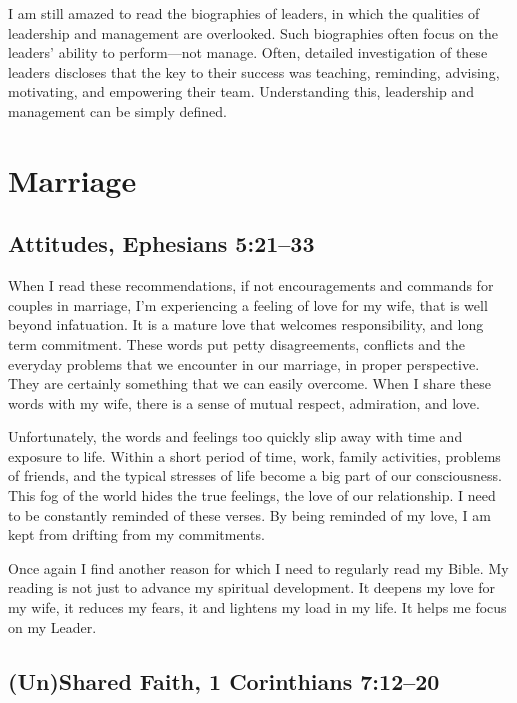 \documentclass[12pt]{memoir}
\begin{document}
I am still amazed to read the biographies of leaders, in which the
qualities of leadership and management are overlooked. Such biographies
often focus on the leaders' ability to perform---not manage. Often,
detailed investigation of these leaders discloses that the key to
their success was teaching, reminding, advising, motivating, and empowering
their team. Understanding this, leadership and management can be simply
defined. 

\section{Marriage}

\subsection[Attitudes]{Attitudes, Ephesians 5:21--33}


When I read these recommendations, if not encouragements and commands for couples in marriage, I'm experiencing a feeling of love for my wife, that is well beyond infatuation. It is a mature love that welcomes
responsibility, and long term commitment. These words put petty disagreements,
conflicts and the everyday problems that we encounter in our marriage,
in proper perspective. They are certainly something that we can easily
overcome. When I share these words with my wife, there is a sense
of mutual respect, admiration, and love.

Unfortunately, the words and feelings too quickly slip away with time
and exposure to life. Within a short period of time, work, family
activities, problems of friends, and the typical stresses of life
become a big part of our consciousness. This fog of the world hides the true feelings, the love of our relationship. I need to be constantly reminded of these verses. By being reminded
of my love, I am kept from drifting from my commitments. 

Once again I find another reason for which I need to regularly read
my Bible. My reading is not just to advance my spiritual development.
It deepens my love for my wife, it reduces my fears, it and lightens
my load in my life. It helps me focus on my Leader.

\subsection[(Un)Shared Faith]{(Un)Shared Faith, 1 Corinthians 7:12--20}
\end{document}

